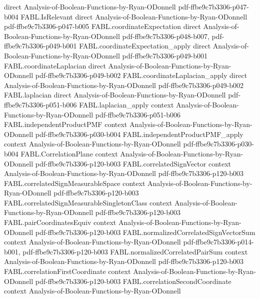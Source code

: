 \begin{theorem}
  {direct}
  {Analysis-of-Boolean-Functions-by-Ryan-ODonnell}
  {pdf-ffbe9c7b3306-p047-b004}
\proofstep
  {FABL.IsRelevant}
  {direct}
  {Analysis-of-Boolean-Functions-by-Ryan-ODonnell}
  {pdf-ffbe9c7b3306-p047-b005}
\proofstep
  {FABL.coordinateExpectation}
  {direct}
  {Analysis-of-Boolean-Functions-by-Ryan-ODonnell}
  {pdf-ffbe9c7b3306-p048-b007,
    pdf-ffbe9c7b3306-p049-b001}
\proofstep
  {FABL.coordinateExpectation_apply}
  {direct}
  {Analysis-of-Boolean-Functions-by-Ryan-ODonnell}
  {pdf-ffbe9c7b3306-p049-b001}
\proofstep
  {FABL.coordinateLaplacian}
  {direct}
  {Analysis-of-Boolean-Functions-by-Ryan-ODonnell}
  {pdf-ffbe9c7b3306-p049-b002}
\proofstep
  {FABL.coordinateLaplacian_apply}
  {direct}
  {Analysis-of-Boolean-Functions-by-Ryan-ODonnell}
  {pdf-ffbe9c7b3306-p049-b002}
\proofstep
  {FABL.laplacian}
  {direct}
  {Analysis-of-Boolean-Functions-by-Ryan-ODonnell}
  {pdf-ffbe9c7b3306-p051-b006}
\proofstep
  {FABL.laplacian_apply}
  {context}
  {Analysis-of-Boolean-Functions-by-Ryan-ODonnell}
  {pdf-ffbe9c7b3306-p051-b006}
\proofstep
  {FABL.independentProductPMF}
  {context}
  {Analysis-of-Boolean-Functions-by-Ryan-ODonnell}
  {pdf-ffbe9c7b3306-p030-b004}
\proofstep
  {FABL.independentProductPMF_apply}
  {context}
  {Analysis-of-Boolean-Functions-by-Ryan-ODonnell}
  {pdf-ffbe9c7b3306-p030-b004}
\proofstep
  {FABL.CorrelationPlane}
  {context}
  {Analysis-of-Boolean-Functions-by-Ryan-ODonnell}
  {pdf-ffbe9c7b3306-p120-b003}
\proofstep
  {FABL.correlatedSignVector}
  {context}
  {Analysis-of-Boolean-Functions-by-Ryan-ODonnell}
  {pdf-ffbe9c7b3306-p120-b003}
\proofstep
  {FABL.correlatedSignMeasurableSpace}
  {context}
  {Analysis-of-Boolean-Functions-by-Ryan-ODonnell}
  {pdf-ffbe9c7b3306-p120-b003}
\proofstep
  {FABL.correlatedSignMeasurableSingletonClass}
  {context}
  {Analysis-of-Boolean-Functions-by-Ryan-ODonnell}
  {pdf-ffbe9c7b3306-p120-b003}
\proofstep
  {FABL.pairCoordinatesEquiv}
  {context}
  {Analysis-of-Boolean-Functions-by-Ryan-ODonnell}
  {pdf-ffbe9c7b3306-p120-b003}
\proofstep
  {FABL.normalizedCorrelatedSignVectorSum}
  {context}
  {Analysis-of-Boolean-Functions-by-Ryan-ODonnell}
  {pdf-ffbe9c7b3306-p014-b001,
    pdf-ffbe9c7b3306-p120-b003}
\proofstep
  {FABL.normalizedCorrelatedPairSum}
  {context}
  {Analysis-of-Boolean-Functions-by-Ryan-ODonnell}
  {pdf-ffbe9c7b3306-p120-b003}
\proofstep
  {FABL.correlationFirstCoordinate}
  {context}
  {Analysis-of-Boolean-Functions-by-Ryan-ODonnell}
  {pdf-ffbe9c7b3306-p120-b003}
\proofstep
  {FABL.correlationSecondCoordinate}
  {context}
  {Analysis-of-Boolean-Functions-by-Ryan-ODonnell}

\end{theorem}
